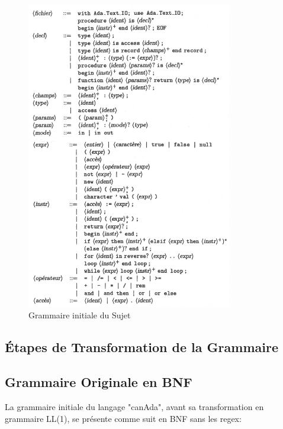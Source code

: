 \documentclass[french,a4paper]{article}
\begin{document}
    \begin{figure}[H]
        \centering
        \includegraphics[width=0.8\textwidth]{grammaire_init}
        \caption{Grammaire initiale du Sujet}
    \end{figure}

    \subsection{Étapes de Transformation de la Grammaire}

    \subsection{Grammaire Originale en BNF}

    La grammaire initiale du langage "canAda", avant sa transformation en grammaire LL(1), se présente comme suit en BNF sans les regex:
\end{document}
